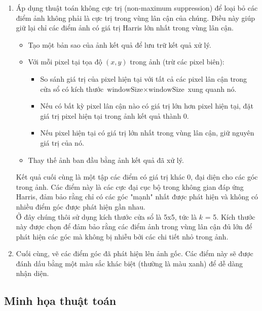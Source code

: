 \documentclass[12pt]{article}
\begin{document}
\begin{enumerate}
    \item Áp dụng thuật toán không cực trị (non-maximum suppression) để loại bỏ các điểm ảnh không phải là cực trị trong vùng lân cận của chúng. Điều này giúp giữ lại chỉ các điểm ảnh có giá trị Harris lớn nhất trong vùng lân cận.
    \begin{itemize}
        \item Tạo một bản sao của ảnh kết quả để lưu trữ kết quả xử lý.
        \item Với mỗi pixel tại tọa độ $(x,y)$ trong ảnh (trừ các pixel biên):
        \begin{itemize}
            \item So sánh giá trị của pixel hiện tại với tất cả các pixel lân cận trong cửa sổ có kích thước $\text{windowSize} \times \text{windowSize}$ xung quanh nó.
            \item Nếu có bất kỳ pixel lân cận nào có giá trị lớn hơn pixel hiện tại, đặt giá trị pixel hiện tại trong ảnh kết quả thành 0.
            \item Nếu pixel hiện tại có giá trị lớn nhất trong vùng lân cận, giữ nguyên giá trị của nó.
        \end{itemize}
        \item Thay thế ảnh ban đầu bằng ảnh kết quả đã xử lý.
    \end{itemize}
    Kết quả cuối cùng là một tập các điểm có giá trị khác 0, đại diện cho các góc trong ảnh. Các điểm này là các cực đại cục bộ trong không gian đáp ứng Harris, đảm bảo rằng chỉ có các góc "mạnh" nhất được phát hiện và không có nhiều điểm góc được phát hiện gần nhau.\\
    Ở đây chúng thôi sử dụng kích thước cửa sổ là 5x5, tức là $k$ = 5. Kích thước này được chọn để đảm bảo rằng các điểm ảnh trong vùng lân cận đủ lớn để phát hiện các góc mà không bị nhiễu bởi các chi tiết nhỏ trong ảnh.
    \item Cuối cùng, vẽ các điểm góc đã phát hiện lên ảnh gốc. Các điểm này sẽ được đánh dấu bằng một màu sắc khác biệt (thường là màu xanh) để dễ dàng nhận diện.
\end{enumerate}

\subsection{Minh họa thuật toán}
\end{document}
